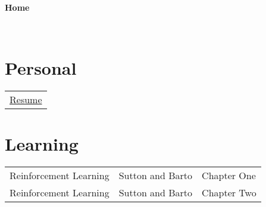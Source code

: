 \documentclass[11pt]{article}
\begin{document}
~
~

\begin{center}
  {
	\fontsize{1.5cm}{1.5cm}
        \textcolor{CalPolyGreen}{\textbf{Home}}
  }

\end{center}

~
~


\section*{\textcolor{CalPolyGreen}{Personal}}
\begin{tabular}{l}
	\href{file:///Users/conorcarroll/Documents/lilcpuppy.github.io/index.html}{Resume}
\end{tabular}

\section*{\textcolor{CalPolyGreen}{Learning}}
\begin{tabular}{lll}
	Reinforcement Learning	& Sutton and Barto  & Chapter One   \\
	Reinforcement Learning	& Sutton and Barto  & Chapter Two   \\
\end{tabular}
\end{document}

